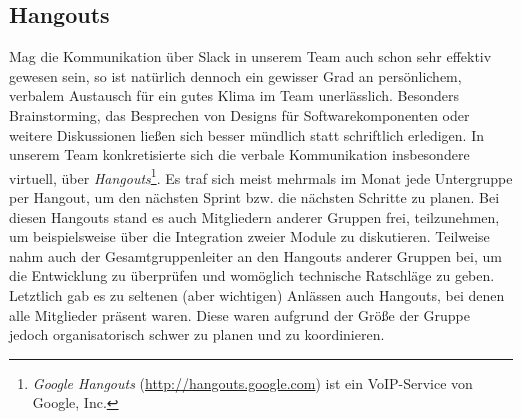 
\vspace{-0.2cm}
\subsection{Hangouts}
\label{team:group-slack}
\vspace{-0.2cm}

Mag die Kommunikation über Slack in unserem Team auch schon sehr effektiv
gewesen sein, so ist natürlich dennoch ein gewisser Grad an persönlichem,
verbalem Austausch für ein gutes Klima im Team unerlässlich. Besonders
Brainstorming, das Besprechen von Designs für Softwarekomponenten oder weitere
Diskussionen ließen sich besser mündlich statt schriftlich erledigen. In unserem
Team konkretisierte sich die verbale Kommunikation insbesondere virtuell, über
\emph{Hangouts}\footnote{\emph{Google Hangouts}
(\url{http://hangouts.google.com}) ist ein VoIP-Service von Google, Inc.}. Es
traf sich meist mehrmals im Monat jede Untergruppe per Hangout, um den nächsten
Sprint bzw. die nächsten Schritte zu planen. Bei diesen Hangouts stand es auch
Mitgliedern anderer Gruppen frei, teilzunehmen, um beispielsweise über die
Integration zweier Module zu diskutieren. Teilweise nahm auch der
Gesamtgruppenleiter an den Hangouts anderer Gruppen bei, um die Entwicklung zu
überprüfen und womöglich technische Ratschläge zu geben. Letztlich gab es zu
seltenen (aber wichtigen) Anlässen auch Hangouts, bei denen alle Mitglieder
präsent waren. Diese waren aufgrund der Größe der Gruppe jedoch organisatorisch
schwer zu planen und zu koordinieren.
